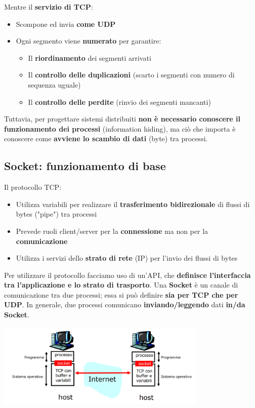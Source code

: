 \documentclass[12pt]{article}
\begin{document}
Mentre il \textbf{servizio di TCP}:
\begin{itemize}
    \item Scompone ed invia \textbf{come UDP}
    \item Ogni segmento viene \textbf{numerato} per garantire:
          \begin{itemize}
              \item Il \textbf{riordinamento} dei segmenti arrivati
              \item Il \textbf{controllo delle duplicazioni} (scarto i segmenti con numero di sequenza uguale)
              \item Il \textbf{controllo delle perdite} (rinvio dei segmenti mancanti)
          \end{itemize}
\end{itemize}
Tuttavia, per progettare sistemi distribuiti \textbf{non è necessario conoscere il funzionamento dei processi} (information hiding), ma ciò che importa è conoscere come \textbf{avviene lo scambio di dati} (byte) tra processi.
\subsection{Socket: funzionamento di base}
Il protocollo TCP:
\begin{itemize}
    \item Utilizza variabili per realizzare il \textbf{trasferimento bidirezionale} di flussi di bytes ("pipe") tra processi
    \item Prevede ruoli client/server per la \textbf{connessione} ma non per la \textbf{comunicazione}
    \item Utilizza i servizi dello \textbf{strato di rete} (IP) per l'invio dei flussi di bytes
\end{itemize}
Per utilizzare il protocollo facciamo uso di un'API, che \textbf{definisce l'interfaccia tra l'applicazione e lo strato di trasporto}. Una \textbf{Socket} è un canale di comunicazione tra due processi; essa si può definire \textbf{sia per TCP che per UDP}. In generale, due processi comunicano \textbf{inviando/leggendo} dati \textbf{in/da Socket}.
\begin{center}
    \includegraphics[width = 0.75\textwidth]{Images/23.png}
\end{center}
\end{document}
